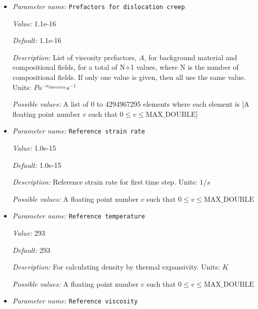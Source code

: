 \begin{itemize}
{\it Possible values:} A list of 0 to 4294967295 elements where each element is [A floating point number $v$ such that $0 \leq v \leq \text{MAX\_DOUBLE}$]
\item {\it Parameter name:} {\tt Prefactors for dislocation creep}
\label{parameters:Material model/Visco Plastic/Prefactors for dislocation creep}


{\it Value:} 1.1e-16


{\it Default:} 1.1e-16


{\it Description:} List of viscosity prefactors, $A$, for background material and compositional fields, for a total of N+1 values, where N is the number of compositional fields. If only one value is given, then all use the same value. Units: $Pa^{-n_{\text{dislocation}}} s^{-1}$


{\it Possible values:} A list of 0 to 4294967295 elements where each element is [A floating point number $v$ such that $0 \leq v \leq \text{MAX\_DOUBLE}$]
\item {\it Parameter name:} {\tt Reference strain rate}
\label{parameters:Material model/Visco Plastic/Reference strain rate}


{\it Value:} 1.0e-15


{\it Default:} 1.0e-15


{\it Description:} Reference strain rate for first time step. Units: $1 / s$


{\it Possible values:} A floating point number $v$ such that $0 \leq v \leq \text{MAX\_DOUBLE}$
\item {\it Parameter name:} {\tt Reference temperature}
\label{parameters:Material model/Visco Plastic/Reference temperature}


{\it Value:} 293


{\it Default:} 293


{\it Description:} For calculating density by thermal expansivity. Units: $K$


{\it Possible values:} A floating point number $v$ such that $0 \leq v \leq \text{MAX\_DOUBLE}$
\item {\it Parameter name:} {\tt Reference viscosity}
\label{parameters:Material model/Visco Plastic/Reference viscosity}



\end{itemize}
